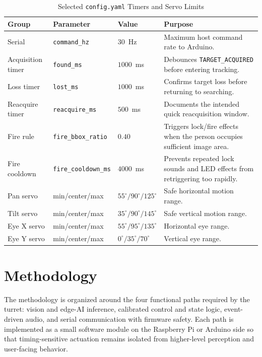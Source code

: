 \documentclass[lettersize,journal]{IEEEtran}
\begin{document}
\begin{table}[!t]
\caption{Selected \texttt{config.yaml} Timers and Servo Limits}
\label{tab:config}
\centering
\footnotesize
\renewcommand{\arraystretch}{1.12}
\begin{tabular}{|p{}|p{}|p{}|p{}|}
\hline
\textbf{Group} & \textbf{Parameter} & \textbf{Value} & \textbf{Purpose}\\
\hline
Serial & \texttt{command\_hz} & $30$~Hz & Maximum host command rate to Arduino.\\
\hline
Acquisition timer & \texttt{found\_ms} & $1000$~ms & Debounces \texttt{TARGET\_ACQUIRED} before entering tracking.\\
\hline
Loss timer & \texttt{lost\_ms} & $1000$~ms & Confirms target loss before returning to searching.\\
\hline
Reacquire timer & \texttt{reacquire\_ms} & $500$~ms & Documents the intended quick reacquisition window.\\
\hline
Fire rule & \texttt{fire\_bbox\_ratio} & $0.40$ & Triggers lock/fire effects when the person occupies sufficient image area.\\
\hline
Fire cooldown & \texttt{fire\_cooldown\_ms} & $4000$~ms & Prevents repeated lock sounds and LED effects from retriggering too rapidly.\\
\hline
Pan servo & min/center/max & $55^\circ/90^\circ/125^\circ$ & Safe horizontal motion range.\\
\hline
Tilt servo & min/center/max & $35^\circ/90^\circ/145^\circ$ & Safe vertical motion range.\\
\hline
Eye X servo & min/center/max & $55^\circ/95^\circ/135^\circ$ & Horizontal eye range.\\
\hline
Eye Y servo & min/center/max & $0^\circ/35^\circ/70^\circ$ & Vertical eye range.\\
\hline
\end{tabular}
\end{table}

\section{Methodology}
\label{sec:method}
The methodology is organized around the four functional paths required by the turret: vision and edge-AI inference, calibrated control and state logic, event-driven audio, and serial communication with firmware safety. Each path is implemented as a small software module on the Raspberry Pi or Arduino side so that timing-sensitive actuation remains isolated from higher-level perception and user-facing behavior.
\end{document}
